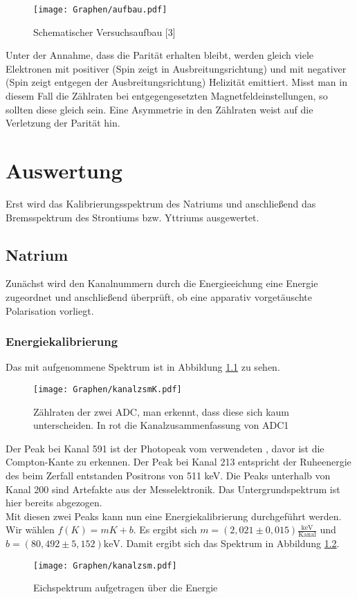 \documentclass[twoside,colorback,accentcolor=tud4c,11pt]{tudreport}
\begin{document}
  
\begin{figure}[H]
\centering
   	\begin{minipage}[b]{1\textwidth}
   	\texttt{[image: Graphen/aufbau.pdf]}
   	\caption{Schematischer Versuchsaufbau [3]}
  	\label{Aa}
   	\end{minipage}
\end{figure}  


Unter der Annahme, dass die Parität erhalten bleibt, werden gleich viele Elektronen mit positiver (Spin zeigt in Ausbreitungsrichtung) und mit negativer (Spin zeigt entgegen der Ausbreitungsrichtung) Helizität emittiert. Misst man in diesem Fall die Zählraten bei entgegengesetzten Magnetfeldeinstellungen, so sollten diese gleich sein. Eine Asymmetrie in den Zählraten weist auf die Verletzung der Parität hin. 
     	     	
\chapter{Auswertung}
Erst wird das Kalibrierungsspektrum des Natriums und anschließend das Bremsspektrum des Strontiums bzw. Yttriums ausgewertet.
\section{Natrium}
Zunächst wird den Kanalnummern durch die Energieeichung eine Energie zugeordnet und anschließend überprüft, ob eine apparativ vorgetäuschte Polarisation vorliegt.
\subsection{Energiekalibrierung}
Das mit  aufgenommene Spektrum ist in Abbildung \ref{fig:kanalK} zu sehen.
\begin{figure}[H]
\centering
   	\begin{minipage}[b]{\textwidth}
   	\texttt{[image: Graphen/kanalzsmK.pdf]}
   	\caption{Zählraten der zwei ADC, man erkennt, dass diese sich kaum unterscheiden. In rot die Kanalzusammenfassung von ADC1}
  	\label{fig:kanalK}
   	\end{minipage}
\end{figure}
Der Peak bei Kanal 591 ist der Photopeak vom verwendeten , davor ist die Compton-Kante zu erkennen. Der Peak bei Kanal 213 entspricht der Ruheenergie des beim Zerfall entstanden Positrons von 511 keV. Die Peaks unterhalb von Kanal 200 sind Artefakte aus der Messelektronik. Das Untergrundspektrum ist hier bereits abgezogen.\\
Mit diesen zwei Peaks kann nun eine Energiekalibrierung durchgeführt werden. Wir wählen $ f(K)=mK+b $. Es ergibt sich $ m=(2,021\pm0,015)\frac{\text{keV}}{\text{Kanal}} $ und $ b=(80,492\pm5,152) \text{keV}$. Damit ergibt sich das Spektrum in Abbildung \ref{fig:kanal}.
\begin{figure}[H]
\centering
   	\begin{minipage}[b]{\textwidth}
   	\centering
   	\texttt{[image: Graphen/kanalzsm.pdf]}
   	\caption{Eichspektrum aufgetragen über die Energie}
  	\label{fig:kanal}
   	\end{minipage}
\end{figure}
\end{document}
